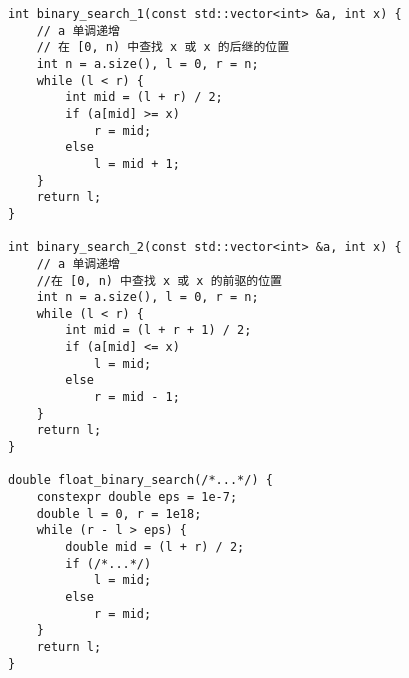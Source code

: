 \begin{lstlisting}
int binary_search_1(const std::vector<int> &a, int x) {
	// a 单调递增
	// 在 [0, n) 中查找 x 或 x 的后继的位置
	int n = a.size(), l = 0, r = n;
	while (l < r) {
		int mid = (l + r) / 2;
		if (a[mid] >= x)
			r = mid;
		else
			l = mid + 1;
	}
	return l;
}

int binary_search_2(const std::vector<int> &a, int x) {
	// a 单调递增
	//在 [0, n) 中查找 x 或 x 的前驱的位置
	int n = a.size(), l = 0, r = n;
	while (l < r) {
		int mid = (l + r + 1) / 2;
		if (a[mid] <= x)
			l = mid;
		else
			r = mid - 1;
	}
	return l;
}

double float_binary_search(/*...*/) {
	constexpr double eps = 1e-7;
	double l = 0, r = 1e18;
	while (r - l > eps) {
		double mid = (l + r) / 2;
		if (/*...*/)
			l = mid;
		else
			r = mid;
	}
	return l;
}
\end{lstlisting}
